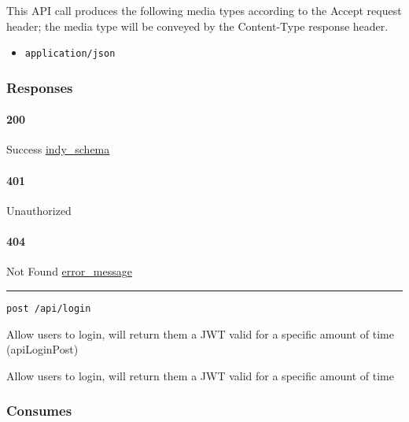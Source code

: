 This API call produces the following media types according to the
{Accept} request header; the media type will be conveyed by the
{Content-Type} response header.

\begin{itemize}
\tightlist
\item
  \texttt{application/json}
\end{itemize}

\hypertarget{responses-164}{%
\subsubsection{Responses}\label{responses-164}}

\hypertarget{section-529}{%
\paragraph{200}\label{section-529}}

Success \protect\hyperlink{indy_schema}{indy\_schema}

\hypertarget{section-530}{%
\paragraph{401}\label{section-530}}

Unauthorized \protect\hyperlink{}{}

\hypertarget{section-531}{%
\paragraph{404}\label{section-531}}

Not Found \protect\hyperlink{error_message}{error\_message}

\begin{center}\rule{0.5\linewidth}{\linethickness}\end{center}

\protect\hypertarget{apiLoginPost}{}{}

\begin{verbatim}
post /api/login
\end{verbatim}

Allow users to login, will return them a JWT valid for a specific amount
of time ({apiLoginPost})

Allow users to login, will return them a JWT valid for a specific amount
of time

\hypertarget{consumes-52}{%
\subsubsection{Consumes}\label{consumes-52}}

